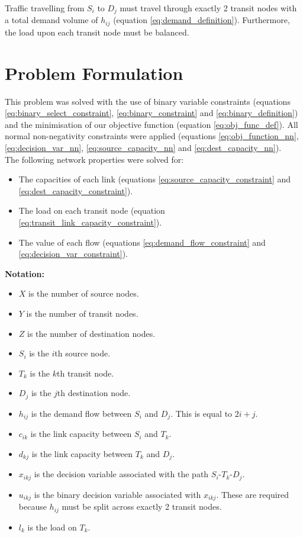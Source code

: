 \documentclass[12pt]{article} %
\begin{document}
Traffic travelling from $S_i$ to $D_j$ must travel through exactly 2 transit nodes with a total demand volume of $h_{ij}$ (equation \ref{eq:demand_definition}). Furthermore, the load upon each transit node must be balanced.

\section{Problem Formulation}

\noindent This problem was solved with the use of binary variable constraints (equations \ref{eq:binary_select_constraint}, \ref{eq:binary_constraint} and \ref{eq:binary_definition}) and the minimisation of our objective function (equation \ref{eq:obj_func_def}).
All normal non-negativity constraints were applied (equations \ref{eq:obj_function_nn}, \ref{eq:decision_var_nn}, \ref{eq:source_capacity_nn} and \ref{eq:dest_capacity_nn}).\\

\noindent The following network properties were solved for:
\begin{itemize}
	\item The capacities of each link (equations \ref{eq:source_capacity_constraint} and \ref{eq:dest_capacity_constraint}).
	\item The load on each transit node (equation \ref{eq:transit_link_capacity_constraint}).
	\item The value of each flow (equations \ref{eq:demand_flow_constraint} and \ref{eq:decision_var_constraint}).
\end{itemize}

\newpage

\noindent \textbf{Notation:}
\begin{itemize}
\item $X$ is the number of source nodes.
\item $Y$ is the number of transit nodes.
\item $Z$ is the number of destination nodes.
\item $S_i$ is the $i$th source node.
\item $T_k$ is the $k$th transit node.
\item $D_j$ is the $j$th destination node.
\item $h_{ij}$ is the demand flow between $S_i$ and $D_j$. This is equal to $2i + j$.
\item $c_{ik}$ is the link capacity between $S_i$ and $T_k$.
\item $d_{kj}$ is the link capacity between $T_k$ and $D_j$.
\item $x_{ikj}$ is the decision variable associated with the path $S_i$-$T_k$-$D_j$.
\item $u_{ikj}$ is the binary decision variable associated with $x_{ikj}$. These are required because $h_{ij}$ must be split across exactly 2 transit nodes.
\item $l_{k}$ is the load on $T_k$.
\end{itemize}
\end{document}
